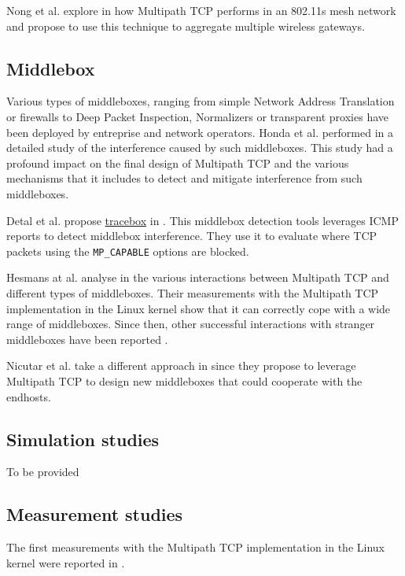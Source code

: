 Nong et al. explore in \cite{Nong_Aggregating:2014} how Multipath TCP performs in an 802.11s mesh network and propose to use this technique to aggregate multiple wireless gateways.

\subsection{Middlebox}

Various types of middleboxes, ranging from simple Network Address Translation or firewalls to Deep Packet Inspection, Normalizers or transparent proxies have been deployed by entreprise and network operators. Honda et al. performed in \cite{Honda_Extend:2011} a detailed study of the interference caused by such middleboxes. This study had a profound impact on the final design of Multipath TCP and the various mechanisms that it includes to detect and mitigate interference from such middleboxes.

Detal et al. propose \href{http://tracebox.org}{tracebox} in \cite{Detal_tracebox:2013}. This middlebox detection tools leverages ICMP reports to detect middlebox interference. They use it to evaluate where TCP packets using the \texttt{MP\_CAPABLE} options are blocked.

Hesmans at al. analyse in \cite{Hesmans_Extensions:2013} the various interactions between Multipath TCP and different types of middleboxes. Their measurements with the Multipath TCP implementation in the Linux kernel show that it can correctly cope with a wide range of middleboxes. Since then, other successful interactions with stranger middleboxes have been reported \cite{draft-ietf-mptcp-experience}.

Nicutar et al. take a different approach in \cite{Nicutar_Acrobatics:2013} since they propose to leverage Multipath TCP to design new middleboxes that could cooperate with the endhosts.

\subsection{Simulation studies}

To be provided

\subsection{Measurement studies}


The first measurements with the Multipath TCP implementation in the Linux kernel were reported in \cite{Barre_Multipath:2011}.


